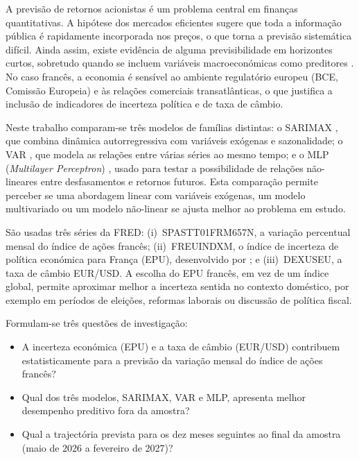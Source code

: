 \documentclass[12pt,a4paper]{article}
\begin{document}
A previsão de retornos acionistas é um problema central em finanças quantitativas. A hipótese dos mercados eficientes \citep{fama1970efficient} sugere que toda a informação pública é rapidamente incorporada nos preços, o que torna a previsão sistemática difícil. Ainda assim, existe evidência de alguma previsibilidade em horizontes curtos, sobretudo quando se incluem variáveis macroeconómicas como preditores \citep{baker2016measuring}. No caso francês, a economia é sensível ao ambiente regulatório europeu (BCE, Comissão Europeia) e às relações comerciais transatlânticas, o que justifica a inclusão de indicadores de incerteza política e de taxa de câmbio.

Neste trabalho comparam-se três modelos de famílias distintas: o SARIMAX \citep{box2015time}, que combina dinâmica autorregressiva com variáveis exógenas e sazonalidade; o VAR \citep{lutkepohl2005new}, que modela as relações entre várias séries ao mesmo tempo; e o MLP (\textit{Multilayer Perceptron}) \citep{haykin2009neural}, usado para testar a possibilidade de relações não-lineares entre desfasamentos e retornos futuros. Esta comparação permite perceber se uma abordagem linear com variáveis exógenas, um modelo multivariado ou um modelo não-linear se ajusta melhor ao problema em estudo.

São usadas três séries da FRED: (i)~SPASTT01FRM657N, a variação percentual mensal do índice de ações francês; (ii)~FREUINDXM, o índice de incerteza de política económica para França (EPU), desenvolvido por \citet{baker2016measuring}; e (iii)~DEXUSEU, a taxa de câmbio EUR/USD. A escolha do EPU francês, em vez de um índice global, permite aproximar melhor a incerteza sentida no contexto doméstico, por exemplo em períodos de eleições, reformas laborais ou discussão de política fiscal.

Formulam-se três questões de investigação:

\begin{itemize}
  \item[\textbf{Q1}] A incerteza económica (EPU) e a taxa de câmbio (EUR/USD) contribuem estatisticamente para a previsão da variação mensal do índice de ações francês?
  \item[\textbf{Q2}] Qual dos três modelos, SARIMAX, VAR e MLP, apresenta melhor desempenho preditivo fora da amostra?
  \item[\textbf{Q3}] Qual a trajectória prevista para os dez meses seguintes ao final da amostra (maio de 2026 a fevereiro de 2027)?
\end{itemize}
\end{document}
